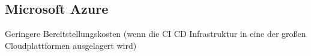 \subsection{Microsoft Azure}
\label{Microsoft Azure}

Geringere Bereitstellungskosten (wenn die CI CD Infrastruktur in eine der großen Cloudplattformen ausgelagert wird)

